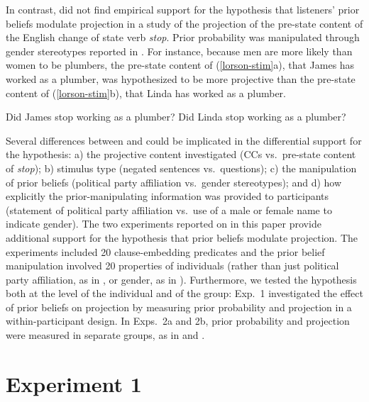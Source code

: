 \documentclass[OpenMind]{stjour}
\begin{document}
In contrast, \citet{lorson2018} did not find empirical support for the hypothesis that listeners' prior beliefs modulate projection %
in a study of the projection of the pre-state content of the English change of state verb {\em stop}. Prior probability was manipulated through gender stereotypes reported in \citet{boyce-etal2018}. For instance, because men are more likely than women to be plumbers, the pre-state content of (\ref{lorson-stim}a), that James has worked as a plumber, was hypothesized to be more projective than the pre-state content of (\ref{lorson-stim}b), that Linda has worked as a plumber.

\begin{exe}
\ex\label{lorson-stim} 
\begin{xlist}
\ex Did James stop working as a plumber?
\ex Did Linda stop working as a plumber? \hfill \cite[38]{lorson2018}
\end{xlist}
\end{exe}

Several differences between \citet{mahler2020} and \citet{lorson2018}  could be implicated in the differential support for the hypothesis: a) the projective content investigated (CCs vs.\ pre-state content of {\em stop}); b) stimulus type (negated sentences vs.\ questions); c) the manipulation of prior beliefs (political party affiliation vs.\ gender stereotypes); and d) how explicitly the prior-manipulating information was provided to participants (statement of political party affiliation vs.\  use of a male or female name to indicate gender). The two experiments reported on in this paper provide additional support for the hypothesis that prior beliefs modulate projection. The experiments included 20 clause-embedding predicates \citep[rather than just 7, as in][]{mahler2020} and the prior belief manipulation involved 20 properties of individuals (rather than just political party affiliation, as in \citet{mahler2020}, or gender, as in \citet{lorson2018}). Furthermore, we tested the hypothesis both at the level of the individual and of the group: Exp.~1 investigated the effect of prior beliefs on projection by measuring prior probability and projection in a within-participant design. In Exps.~2a and 2b, prior probability and projection were measured in separate groups, as in \citet{mahler2020} and \citet{lorson2018}. 

\section{Experiment 1}\label{s2}
\end{document}
